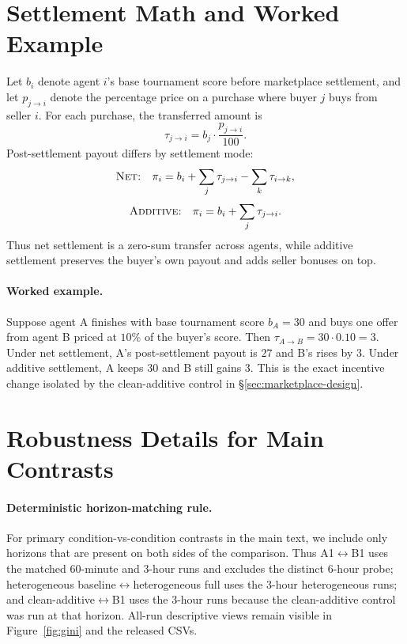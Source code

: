 \documentclass{article}
\begin{document}
\section{Settlement Math and Worked Example}
\label{app:settlement-math}

Let $b_i$ denote agent $i$'s base tournament score before marketplace settlement, and let $p_{j \rightarrow i}$ denote the percentage price on a purchase where buyer $j$ buys from seller $i$.
For each purchase, the transferred amount is
\[
\tau_{j \rightarrow i} = b_j \cdot \frac{p_{j \rightarrow i}}{100}.
\]
Post-settlement payout differs by settlement mode:
\[
\textsc{Net:}\quad \pi_i = b_i + \sum_j \tau_{j \rightarrow i} - \sum_k \tau_{i \rightarrow k},
\]
\[
\textsc{Additive:}\quad \pi_i = b_i + \sum_j \tau_{j \rightarrow i}.
\]
Thus net settlement is a zero-sum transfer across agents, while additive settlement preserves the buyer's own payout and adds seller bonuses on top.

\paragraph{Worked example.}
Suppose agent A finishes with base tournament score $b_A = 30$ and buys one offer from agent B priced at $10\%$ of the buyer's score.
Then $\tau_{A \rightarrow B} = 30 \cdot 0.10 = 3$.
Under net settlement, A's post-settlement payout is $27$ and B's rises by $3$.
Under additive settlement, A keeps $30$ and B still gains $3$.
This is the exact incentive change isolated by the clean-additive control in \S\ref{sec:marketplace-design}.

\section{Robustness Details for Main Contrasts}
\label{app:payout-triangulation}

\paragraph{Deterministic horizon-matching rule.}
For primary condition-vs-condition contrasts in the main text, we include only horizons that are present on both sides of the comparison.
Thus A1$\leftrightarrow$B1 uses the matched 60-minute and 3-hour runs and excludes the distinct 6-hour probe; heterogeneous baseline$\leftrightarrow$heterogeneous full uses the 3-hour heterogeneous runs; and clean-additive$\leftrightarrow$B1 uses the 3-hour runs because the clean-additive control was run at that horizon.
All-run descriptive views remain visible in Figure~\ref{fig:gini} and the released CSVs.
\end{document}
